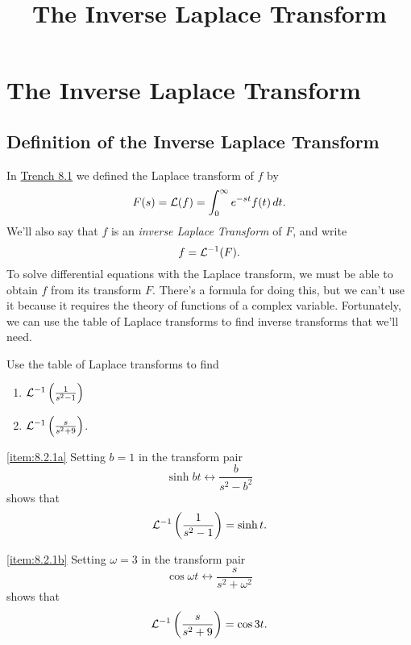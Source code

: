 \documentclass{ximera}
\title{The Inverse Laplace Transform}%
\begin{document}
\begin{abstract}

\end{abstract}

\maketitle

\section*{The Inverse Laplace Transform}

\subsection*{Definition of the Inverse Laplace Transform}

In \href{https://ximera.osu.edu/ode/main/introToLaplace/introToLaplace}{Trench 8.1} we defined the Laplace transform
of
$f$ by
$$
F(s)={\cal L}(f)=\int_0^\infty e^{-st}f(t)\,dt.
$$
We'll also say that $f$ is an \textit{inverse Laplace Transform} of
$F$, and write
$$
f={\cal L}^{-1}(F).
$$
To solve differential equations with the Laplace transform, we
must be able to obtain $f$ from its transform $F$. There's a formula
for doing this, but we can't use it because it requires the theory of
functions of a complex variable. Fortunately, we can use the table of
Laplace transforms to find inverse transforms that we'll need.

\begin{example}\label{example:8.2.1}
Use the table of Laplace transforms to find
\begin{enumerate}
    
    \item\label{item:8.2.1a} ${\cal L}^{-1}\left(\frac{1}{s^2-1}\right)$
    \item\label{item:8.2.1b} ${\cal L}^{-1}\left(\frac{s}{s^2+9}\right)$. 
\end{enumerate}
\begin{explanation}
\ref{item:8.2.1a}
Setting $b=1$ in  the transform pair
$$
\sinh bt\leftrightarrow \frac{b}{s^2-b^2}
$$
shows that
$$
{\cal L}^{-1}\left(\frac{1}{s^2-1}\right)=\sinh t.
$$

\ref{item:8.2.1b}
Setting $\omega=3$ in  the transform pair
$$
\cos\omega t\leftrightarrow\frac{s}{s^2+\omega^2}
$$
shows that
$$
{\cal L}^{-1}\left(\frac{s}{s^2+9}\right)=\cos3t.
$$
\end{explanation}
\end{example}
\end{document}
